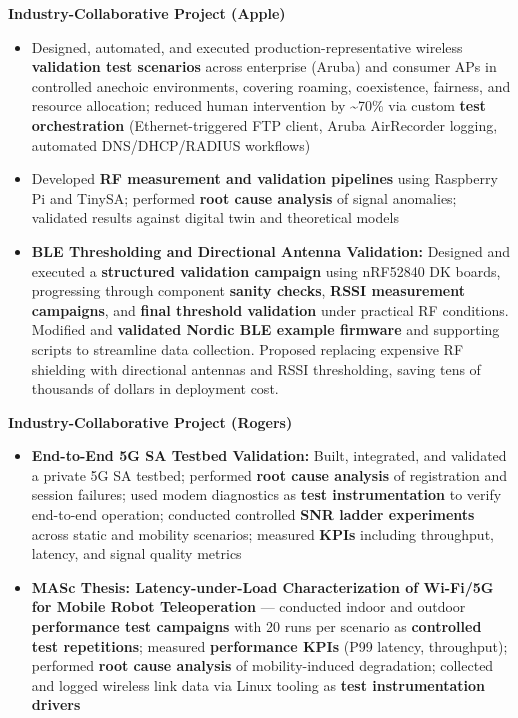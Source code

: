 \documentclass[letterpaper,11pt]{article}
\begin{document}
\item \textbf{Industry-Collaborative Project (Apple)}
\begin{itemize}[leftmargin=1.5em]
 \item Designed, automated, and executed production-representative wireless \textbf{validation test scenarios} across enterprise (Aruba) and consumer APs in controlled anechoic environments, covering roaming, coexistence, fairness, and resource allocation; reduced human intervention by \textasciitilde70\% via custom \textbf{test orchestration} (Ethernet-triggered FTP client, Aruba AirRecorder logging, automated DNS/DHCP/RADIUS workflows)

\item Developed \textbf{RF measurement and validation pipelines} using Raspberry Pi and TinySA; performed \textbf{root cause analysis} of signal anomalies; validated results against digital twin and theoretical models
 

\item \textbf{BLE Thresholding and Directional Antenna Validation:} Designed and executed a \textbf{structured validation campaign} using nRF52840 DK boards, progressing through component \textbf{sanity checks}, \textbf{RSSI measurement campaigns}, and \textbf{final threshold validation} under practical RF conditions. Modified and \textbf{validated Nordic BLE example firmware} and supporting scripts to streamline data collection. Proposed replacing expensive RF shielding with directional antennas and RSSI thresholding, saving tens of thousands of dollars in deployment cost.
  
\end{itemize}


\item \textbf{Industry-Collaborative Project (Rogers)}
\begin{itemize}[leftmargin=1.5em]
\item \textbf{End-to-End 5G SA Testbed Validation:} Built, integrated, and validated a private 5G SA testbed; performed \textbf{root cause analysis} of registration and session failures; used modem diagnostics as \textbf{test instrumentation} to verify end-to-end operation; conducted controlled \textbf{SNR ladder experiments} across static and mobility scenarios; measured \textbf{KPIs} including throughput, latency, and signal quality metrics

\item \textbf{MASc Thesis: Latency-under-Load Characterization of Wi-Fi/5G for Mobile Robot Teleoperation} --- conducted indoor and outdoor \textbf{performance test campaigns} with 20 runs per scenario as \textbf{controlled test repetitions}; measured \textbf{performance KPIs} (P99 latency, throughput); performed \textbf{root cause analysis} of mobility-induced degradation; collected and logged wireless link data via Linux tooling as \textbf{test instrumentation drivers}





    
\end{itemize}
\end{document}
